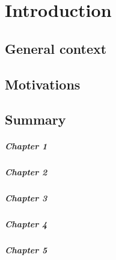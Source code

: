 
\chapter*{Introduction}

{}

\section*{General context}

\section*{Motivations}


\section*{Summary}


\paragraph*{Chapter 1}


\paragraph*{Chapter 2}


\paragraph*{Chapter 3}


\paragraph*{Chapter 4}


\paragraph*{Chapter 5}
